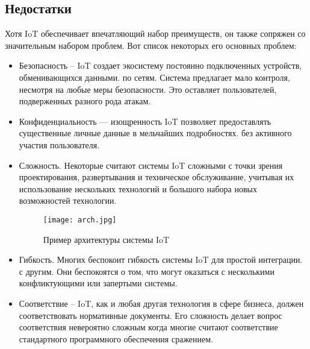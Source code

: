 \subsection{Недостатки}
Хотя IoT обеспечивает впечатляющий набор преимуществ, он также сопряжен со значительным набором проблем.
Вот список некоторых его основных проблем:
\begin{itemize}
    \item Безопасность – IoT создает экосистему постоянно подключенных устройств, обменивающихся данными.
    по сетям. Система предлагает мало контроля, несмотря на любые меры безопасности. Это оставляет
    пользователей, подверженных разного рода атакам.
    \item Конфиденциальность — изощренность IoT позволяет предоставлять существенные личные данные в мельчайших подробностях.
    без активного участия пользователя.
    \item Сложность. Некоторые считают системы IoT сложными с точки зрения проектирования, развертывания и
    техническое обслуживание, учитывая их использование нескольких технологий и большого набора новых возможностей
    технологии.
    \begin{figure}[h!]
        \centering
        \texttt{[image: arch.jpg]}
        \caption{Пример архитектуры системы IoT}
        \label{fig:task5:graph}
    \end{figure}
    \item Гибкость. Многих беспокоит гибкость системы IoT для простой интеграции.
    с другим. Они беспокоятся о том, что могут оказаться с несколькими конфликтующими или запертыми
    системы.
    \item Соответствие – IoT, как и любая другая технология в сфере бизнеса, должен соответствовать
    нормативные документы. Его сложность делает вопрос соответствия невероятно сложным
    когда многие считают соответствие стандартного программного обеспечения сражением.
\end{itemize}